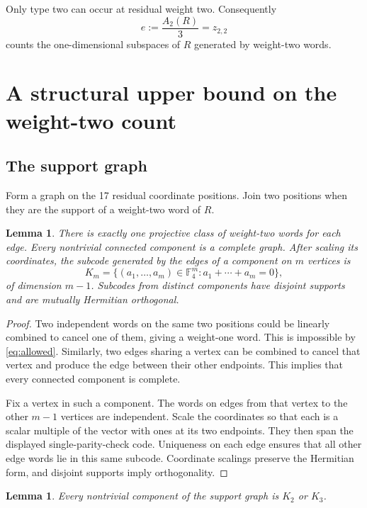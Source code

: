 \documentclass[11pt]{article}
\newtheorem{lemma}[theorem]{Lemma}
\theoremstyle{remark}
\newcommand{\F}{\mathbb F_4}
\begin{document}
Only type two can occur at residual weight two.  Consequently
\begin{equation}
 e:=\frac{A_2(R)}3=z_{2,2}
 \label{eq:e}
\end{equation}
counts the one-dimensional subspaces of $R$ generated by weight-two
words.

\section{A structural upper bound on the weight-two count}

\subsection{The support graph}

Form a graph on the 17 residual coordinate positions.  Join two positions
when they are the support of a weight-two word of $R$.

\begin{lemma}\label{lem:graph}
There is exactly one projective class of weight-two words for each edge.
Every nontrivial connected component is a complete graph.  After scaling
its coordinates, the subcode generated by the edges of a component on
$m$ vertices is
\[
 K_m=\{(a_1,\ldots,a_m)\in\F^m:a_1+\cdots+a_m=0\},
\]
of dimension $m-1$.  Subcodes from distinct components have disjoint
supports and are mutually Hermitian orthogonal.
\end{lemma}

\begin{proof}
Two independent words on the same two positions could be linearly
combined to cancel one of them, giving a weight-one word.  This is
impossible by \eqref{eq:allowed}.  Similarly, two edges sharing a
vertex can be combined to cancel that vertex and produce the edge
between their other endpoints.  This implies that every connected
component is complete.

Fix a vertex in such a component.  The words on edges from that vertex
to the other $m-1$ vertices are independent.  Scale the coordinates so
that each is a scalar multiple of the vector with ones at its two
endpoints.  They then span the displayed single-parity-check code.
Uniqueness on each edge ensures that all other edge words lie in this
same subcode.  Coordinate scalings preserve the Hermitian form, and
disjoint supports imply orthogonality.
\end{proof}

\begin{lemma}\label{lem:noK4}
Every nontrivial component of the support graph is $K_2$ or $K_3$.
\end{lemma}
\end{document}
